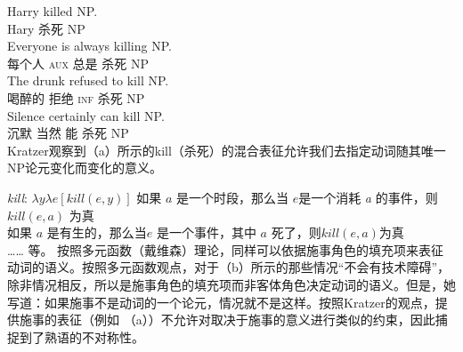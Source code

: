 \eal
\ex 
\gll Harry killed NP.\\
     Hary 杀死 NP\\
\ex 
\gll Everyone is always killing NP.\\
     每个人 \textsc{aux} 总是 杀死 NP\\
\ex 
\gll The drunk refused to kill NP.\\
      喝醉的 拒绝 \textsc{inf} 杀死 NP\\
\ex 
\gll Silence certainly can kill NP.\\
     沉默 当然 能 杀死 NP\\
\zl
Kratzer观察到（a）所示的kill（杀死）的混合表征允许我们去指定动词随其唯一NP论元变化而变化的意义。

\eal
\ex \emph{kill}: $\lambda y\lambda e[kill(e, y)]$ 
\ex 如果 $a$ 是一个时段，那么当 $e$是一个消耗 \emph{a} 的事件，则 $kill(e, a)$ 为真 \\
如果 $a$ 是有生的，那么当$e$ 是一个事件，其中 $a$ 死了，则$kill(e, a) $为真  \\
……{} 等。
\zl
按照多元函数（戴维森）理论，同样可以依据施事角色的填充项来表征动词的语义。按照多元函数观点，对于（b）所示的那些情况“不会有技术障碍”\citep[]{Kratzer96a}，除非情况相反，所以是施事角色的填充项而非客体角色决定动词的语义。但是，她写道：如果施事不是动词的一个论元，情况就不是这样。按照Kratzer的观点，提供施事的表征（例如 （a））不允许对取决于施事的意义进行类似的约束，因此捕捉到了熟语的不对称性。

